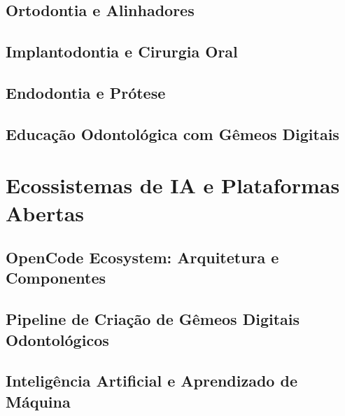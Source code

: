 \newpage
\chapter{Ortodontia e Alinhadores} \label{ch:ortodontia}


\newpage
\chapter{Implantodontia e Cirurgia Oral} \label{ch:implantodontia}


\newpage
\chapter{Endodontia e Prótese} \label{ch:endodontia}


\newpage
\chapter{Educação Odontológica com Gêmeos Digitais} \label{ch:educacao}


\part{Ecossistemas de IA e Plataformas Abertas}
\newpage
\chapter{OpenCode Ecosystem: Arquitetura e Componentes} \label{ch:opencode}


\newpage
\chapter{Pipeline de Criação de Gêmeos Digitais Odontológicos} \label{ch:pipeline}


\newpage
\chapter{Inteligência Artificial e Aprendizado de Máquina} \label{ch:ia}



